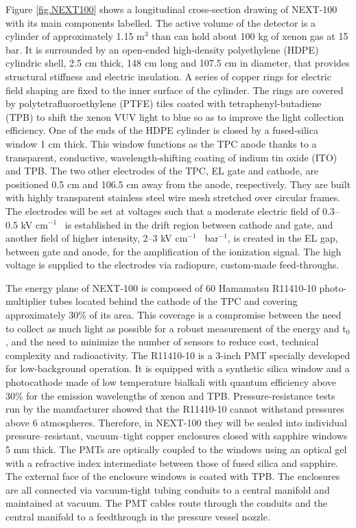 Figure \ref{fig.NEXT100} shows a longitudinal cross-section drawing of NEXT-100 with its main components labelled. The active volume of the detector is a cylinder of approximately 1.15 m$^3$ than can hold about 100 kg of xenon gas at 15 bar. It is surrounded by an open-ended high-density polyethylene (HDPE) cylindric shell, 2.5 cm thick, 148 cm long and 107.5 cm in diameter, that provides structural stiffness and electric insulation. A series of copper rings for electric field shaping are fixed to the inner surface of the cylinder. The rings are covered by polytetrafluoroethylene (PTFE) tiles coated with tetraphenyl-butadiene (TPB) to shift the xenon VUV light to blue so as to improve the light collection efficiency. One of the ends of the HDPE cylinder is closed by a fused-silica window 1 cm thick. This window functions as the TPC anode thanks to a transparent, conductive, wavelength-shifting coating of indium tin oxide (ITO) and TPB. The two other electrodes of the TPC, EL gate and cathode, are positioned 0.5 cm and 106.5 cm away from the anode, respectively. They are built with highly transparent stainless steel wire mesh stretched over circular frames. The electrodes will be set at voltages such that a moderate electric field of 0.3--0.5 kV cm$^{−1}$~ is established in the drift region between cathode and gate, and another field of higher intensity, 2--3 kV cm$^{−1}$~ bar$^{−1}$, is created in the EL gap, between gate and anode, for the amplification of the ionization signal. The high voltage is supplied to the electrodes via radiopure, custom-made feed-throughs.

The energy plane of NEXT-100 is composed of 60 Hamamatsu R11410-10 photo-multiplier tubes located behind the cathode of the TPC and covering approximately 30\% of its area. This coverage is a compromise between the need to collect as much light as possible for a robust measurement of the energy and t$_0$, and the need to minimize the number of sensors to reduce cost, technical complexity and radioactivity. The R11410-10 is a 3-inch PMT specially developed for low-background operation. It is equipped with a synthetic silica window and a photocathode made of low temperature bialkali with quantum efficiency above 30\% for the emission wavelengths of xenon and TPB. Pressure-resistance tests run by the manufacturer showed that the R11410-10 cannot withstand pressures above 6 atmospheres. Therefore, in NEXT-100 they will be sealed into individual pressure--resistant, vacuum--tight copper enclosures closed with sapphire windows 5 mm thick. The PMTs are optically coupled to the windows using an optical gel with a refractive index intermediate between those of fused silica and sapphire. The external face of the enclosure windows is coated with TPB. The enclosures are all connected via vacuum-tight tubing conduits to a central manifold and maintained at vacuum. The PMT cables route through the conduits and the central manifold to a feedthrough in the pressure vessel nozzle.

